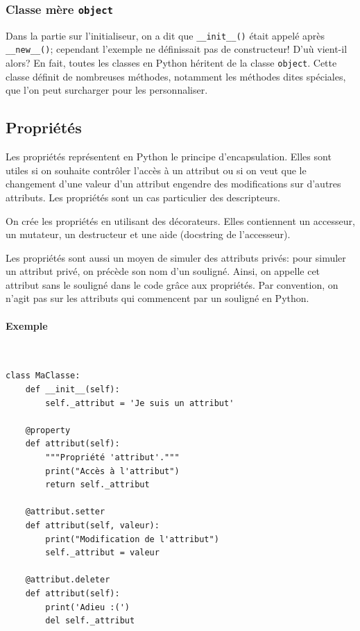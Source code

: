 \documentclass[a4paper, 10pt]{article}
\begin{document}
\subsubsection{Classe mère \texttt{object}}
Dans la partie sur l'initialiseur, on a dit que \texttt{__init__()} était appelé après \texttt{__new__()}; cependant l'exemple ne définissait pas de constructeur! D'uù vient-il alors? En fait, toutes les classes en Python héritent de la classe \texttt{object}. Cette classe définit de nombreuses méthodes, notamment les méthodes dites spéciales, que l'on peut surcharger pour les personnaliser.

\subsection{Propriétés}
\label{sec:proprietes}
 Les propriétés représentent en Python le principe d'encapsulation. Elles sont utiles si on souhaite contrôler l'accès à un attribut ou si on veut que le changement d'une valeur d'un attribut engendre des modifications sur d'autres attributs. Les propriétés sont un cas particulier des descripteurs.\bigskip

On crée les propriétés en utilisant des décorateurs. Elles contiennent un accesseur, un mutateur, un destructeur et une aide (docstring de l'accesseur).\bigskip

Les propriétés sont aussi un moyen de simuler des attributs privés: pour simuler un attribut privé, on précède son nom d'un souligné. Ainsi, on appelle cet attribut sans le souligné dans le code grâce aux propriétés. Par convention, on n'agit pas sur les attributs qui commencent par un souligné en Python.

\paragraph{Exemple}~
\begin{verbatim}
class MaClasse:
    def __init__(self):
        self._attribut = 'Je suis un attribut'

    @property
    def attribut(self):
        """Propriété 'attribut'."""
        print("Accès à l'attribut")
        return self._attribut

    @attribut.setter
    def attribut(self, valeur):
        print("Modification de l'attribut")
        self._attribut = valeur

    @attribut.deleter
    def attribut(self):
        print('Adieu :(')
        del self._attribut
\end{verbatim}
\end{document}
